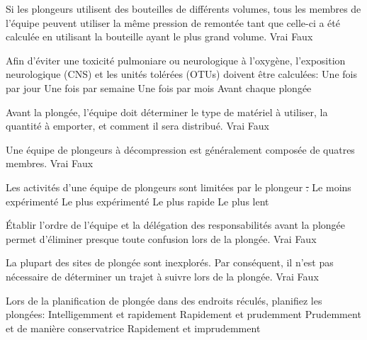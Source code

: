 \documentclass[english,10pt,a4paper,twoside]{article}
\begin{document}
\begin{outline}
		\1 Si les plongeurs utilisent des bouteilles de différents volumes, tous les membres de l'équipe peuvent utiliser la même pression de remontée tant que celle-ci a été calculée en utilisant la bouteille ayant le plus grand volume.
			\2 Vrai
			\2 Faux

		\1 Afin d'éviter une toxicité pulmoniare ou neurologique à l'oxygène, l'exposition neurologique (CNS) et les unités tolérées (OTUs) doivent être calculées:
			\2 Une fois par jour
			\2 Une fois par semaine
			\2 Une fois par mois
			\2 Avant chaque plongée

		\1 Avant la plongée, l'équipe doit déterminer le type de matériel à utiliser, la quantité à emporter, et comment il sera distribué.
			\2 Vrai
			\2 Faux

		\1 Une équipe de plongeurs à décompression est généralement composée de quatres membres.
			\2 Vrai
			\2 Faux

		\1 Les activités d'une équipe de plongeurs sont limitées par le plongeur \st.
			\2 Le moins expérimenté
			\2 Le plus expérimenté
			\2 Le plus rapide
			\2 Le plus lent

		\1 Établir l'ordre de l'équipe et la délégation des responsabilités avant la plongée permet d'éliminer presque toute confusion lors de la plongée.
			\2 Vrai
			\2 Faux

		\1 La plupart des sites de plongée sont inexplorés. Par conséquent, il n'est pas nécessaire de déterminer un trajet à suivre lors de la plongée.
			\2 Vrai
			\2 Faux

		\1 Lors de la planification de plongée dans des endroits réculés, planifiez les plongées:
			\2 Intelligemment et rapidement
			\2 Rapidement et prudemment
			\2 Prudemment et de manière conservatrice
			\2 Rapidement et imprudemment
	\end{outline}
	\vfill
	\pagebreak

\end{document}
